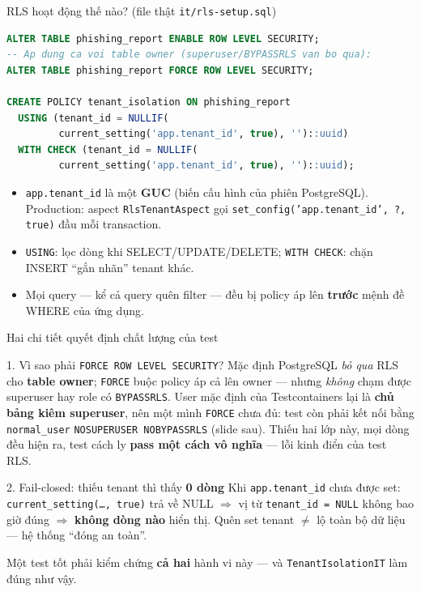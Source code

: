 \documentclass[aspectratio=169,12pt]{beamer}
\begin{document}
\begin{frame}[fragile]{RLS hoạt động thế nào? (file thật \texttt{it/rls-setup.sql})}
\begin{lstlisting}[language=SQL,style=code,aboveskip=0pt]
ALTER TABLE phishing_report ENABLE ROW LEVEL SECURITY;
-- Ap dung ca voi table owner (superuser/BYPASSRLS van bo qua):
ALTER TABLE phishing_report FORCE ROW LEVEL SECURITY;

CREATE POLICY tenant_isolation ON phishing_report
  USING (tenant_id = NULLIF(
         current_setting('app.tenant_id', true), '')::uuid)
  WITH CHECK (tenant_id = NULLIF(
         current_setting('app.tenant_id', true), '')::uuid);
\end{lstlisting}
  \begin{itemize}\small
    \item \texttt{app.tenant\_id} là một \textbf{GUC} (biến cấu hình của phiên
      PostgreSQL). Production: aspect \texttt{RlsTenantAspect} gọi
      \texttt{set\_config('app.tenant\_id', ?, true)} đầu mỗi transaction.
    \item \texttt{USING}: lọc dòng khi SELECT/UPDATE/DELETE;
      \texttt{WITH CHECK}: chặn INSERT ``gắn nhãn'' tenant khác.
    \item Mọi query --- kể cả query quên filter --- đều bị policy áp lên
      \textbf{trước} mệnh đề WHERE của ứng dụng.
  \end{itemize}
\end{frame}

\begin{frame}{Hai chi tiết quyết định chất lượng của test}
  \begin{alertblock}{1. Vì sao phải \texttt{FORCE ROW LEVEL SECURITY}?}
    \small Mặc định PostgreSQL \emph{bỏ qua} RLS cho \textbf{table owner};
    \texttt{FORCE} buộc policy áp cả lên owner --- nhưng \emph{không} chạm
    được superuser hay role có \texttt{BYPASSRLS}. User mặc định của
    Testcontainers lại là \textbf{chủ bảng kiêm superuser}, nên một mình
    \texttt{FORCE} chưa đủ: test còn phải kết nối bằng \texttt{normal\_user}
    \texttt{NOSUPERUSER NOBYPASSRLS} (slide sau). Thiếu hai lớp này, mọi dòng
    đều hiện ra, test cách ly \textbf{pass một cách vô nghĩa} --- lỗi kinh
    điển của test RLS.
  \end{alertblock}
  \begin{block}{2. Fail-closed: thiếu tenant thì thấy \textbf{0 dòng}}
    \small Khi \texttt{app.tenant\_id} chưa được set:
    \texttt{current\_setting(\ldots, true)} trả về NULL
    $\Rightarrow$ vị từ \texttt{tenant\_id = NULL} không bao giờ đúng
    $\Rightarrow$ \textbf{không dòng nào} hiển thị. Quên set tenant $\ne$ lộ
    toàn bộ dữ liệu --- hệ thống ``đóng an toàn''.
  \end{block}
  \small Một test tốt phải kiểm chứng \textbf{cả hai} hành vi này --- và
  \texttt{TenantIsolationIT} làm đúng như vậy.
\end{frame}
\end{document}
